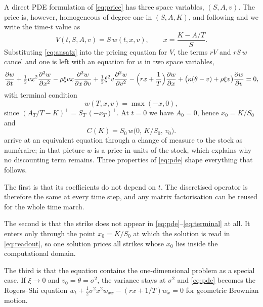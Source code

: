 A direct PDE formulation of \eqref{eq:price} has three space variables, $(S,A,v)$. The price is,
however, homogeneous of degree one in $(S,A,K)$, and following \citet{RogersShi1995} and
\citet{Vecer2001,Vecer2002} we write the time-$t$ value as
\begin{equation}\label{eq:ansatz}
V(t,S,A,v) = S\,w(t,x,v),\qquad x = \frac{K - A/T}{S}.
\end{equation}
Substituting \eqref{eq:ansatz} into the pricing equation for $V$, the terms $rV$ and $rS\,w$ cancel and
one is left with an equation for $w$ in two space variables,
\begin{equation}\label{eq:pde}
\frac{\partial w}{\partial t}
+ \tfrac12 v x^2 \frac{\partial^2 w}{\partial x^2}
- \rho\xi v x \frac{\partial^2 w}{\partial x\,\partial v}
+ \tfrac12 \xi^2 v \frac{\partial^2 w}{\partial v^2}
- \Bigl(r x + \frac1T\Bigr)\frac{\partial w}{\partial x}
+ \bigl(\kappa(\theta - v) + \rho\xi v\bigr)\frac{\partial w}{\partial v} = 0,
\end{equation}
with terminal condition
\begin{equation}\label{eq:terminal}
w(T,x,v) = \max(-x,0),
\end{equation}
since $(A_T/T-K)^+ = S_T\,(-x_T)^+$. At $t=0$ we have $A_0=0$, hence $x_0=K/S_0$ and
\begin{equation}\label{eq:readout}
C(K) = S_0\,w\bigl(0,\,K/S_0,\,v_0\bigr).
\end{equation}
\citet{EwaldMenkensTing2013} arrive at an equivalent equation through a change of measure to the stock
as num\'eraire; in that picture $w$ is a price in units of the stock, which explains why no discounting
term remains. Three properties of \eqref{eq:pde} shape everything that follows.

The first is that its coefficients do not depend on $t$. The discretised operator is therefore the same
at every time step, and any matrix factorisation can be reused for the whole time march.

The second is that the strike does not appear in \eqref{eq:pde}--\eqref{eq:terminal} at all. It enters
only through the point $x_0=K/S_0$ at which the solution is read in \eqref{eq:readout}, so one solution
prices all strikes whose $x_0$ lies inside the computational domain.

The third is that the equation contains the one-dimensional problem as a special case. If $\xi\to0$ and
$v_0=\theta=\sigma^2$, the variance stays at $\sigma^2$ and \eqref{eq:pde} becomes the Rogers--Shi
equation $w_t + \tfrac12\sigma^2x^2w_{xx} - (rx + 1/T)w_x = 0$ for geometric Brownian motion.

